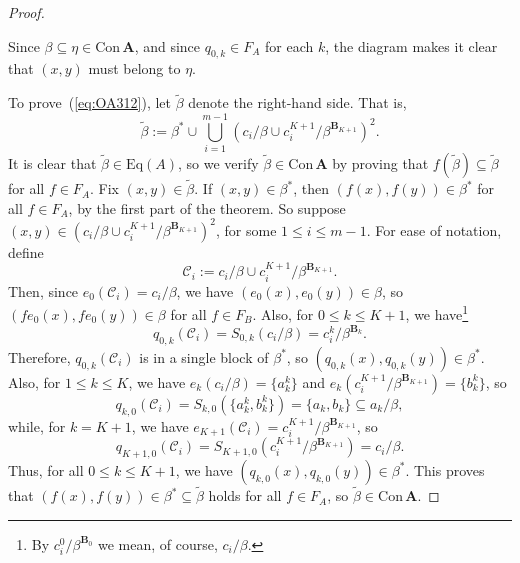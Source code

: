 \documentclass[cm,dissertation]{uhthesis}
\theoremstyle{plain}
\theoremstyle{definition}
\theoremstyle{remark}
\numberwithin{theorem}{section}
\numberwithin{claim}{chapter}
\numberwithin{equation}{section}
\numberwithin{conjecture}{chapter}
\newcommand{\<}{\ensuremath{\langle}}
\renewcommand{\>}{\ensuremath{\rangle}}
\renewcommand{\leq}{\ensuremath{\leqslant}}
\newcommand{\Eq}{\ensuremath{\mathrm{Eq}}}
\newcommand{\Con}{\ensuremath{\mathrm{Con\,}}}
\newcommand{\0}{\ensuremath{\mathbf{0}}}
\newcommand{\1}{\ensuremath{\mathbf{1}}}
\newcommand{\2}{\ensuremath{\mathbf{2}}}
\newcommand{\3}{\ensuremath{\mathbf{3}}}
\newcommand{\4}{\ensuremath{\mathbf{4}}}
\newcommand{\5}{\ensuremath{\mathbf{5}}}
\newcommand{\bA}{\ensuremath{\mathbf{A}}}
\newcommand{\bB}{\ensuremath{\mathbf{B}}}
\newcommand{\sC}{\ensuremath{\mathscr{C}}}
\newcommand{\tbeta}{\ensuremath{\widetilde{\beta}}}
\newcommand{\cick}{\ensuremath{\sC_i}}
\newcommand{\CICK}{\ensuremath{c_i/\beta \cup c^{K+1}_i/\beta^{\bB_{K+1}}}}
\begin{document}
\begin{proof}
\begin{center}
  \end{center}
  Since $\beta \subseteq \eta \in \Con\bA$, and since $q_{0,k}\in F_A$ for each
  $k$, the diagram makes it clear that $(x,y)$ must belong to $\eta$.

  To prove~(\ref{eq:OA312}), let $\widetilde{\beta}$ denote the right-hand side.  That
  is,
  \[
  \widetilde{\beta}:= \beta^* \cup \bigcup_{i=1}^{m-1} 
  (c_i/\beta \cup c^{K+1}_i/\beta^{\bB_{K+1}})^2.
  \]
  It is clear that $\tbeta \in \Eq(A)$, so we verify $\widetilde{\beta} \in
  \Con \bA$ by proving that $f(\tbeta) \subseteq \tbeta$ for all $f\in F_A$.
  Fix $(x,y) \in \tbeta$.  If 
  $(x,y) \in \beta^*$, then 
  $(f(x),f(y))\in \beta^*$ for all $f\in F_A$, by the first part of the theorem.
  So suppose 
  $(x,y) \in (\CICK)^2$, 
  for some $1\leq i \leq m-1$.
  For ease of notation, define
  \[
  \cick := \CICK.
  \]
  Then, since
  $e_0(\cick) = c_i/\beta$, we have
  $(e_0(x), e_0(y))\in \beta$, so
  $(fe_0(x), fe_0(y))\in \beta$ for all $f\in F_B$.
  Also, for $0\leq k\leq K+1$, we 
  have\footnote{By $c_i^{0}/\beta^{\bB_{0}}$ we mean, of course, $c_i/\beta$.}
  \[
  q_{0,k}(\cick) = S_{0,k}(c_i/\beta) = 
  c_i^{k}/\beta^{\bB_{k}}.
  \]
  Therefore,
  $q_{0,k}(\cick)$ is in a single block of $\beta^*$, so 
  $(q_{0,k}(x), q_{0,k}(y)) \in \beta^*$.
  Also, for $1\leq k \leq K$, we have 
  $e_k(c_i/\beta) = \{a_k^k\}$ and 
  $e_k(c_i^{K+1}/\beta^{\bB_{K+1}})= \{b_k^k\}$, so 
  \[
  q_{k,0}(\cick) = S_{k,0}(\{a_k^k, b_k^k\}) = \{a_k, b_k\} \subseteq a_k/\beta,
  \]
  while, for $k=K+1$, we have 
  $e_{K+1}(\cick) = c_i^{K+1}/\beta^{\bB_{K+1}}$, so 
  \[
  q_{K+1,0}(\cick) = S_{K+1,0}(c_i^{K+1}/\beta^{\bB_{K+1}}) = c_i/\beta.
  \]
  Thus, for all $0\leq k \leq K+1$, we have 
  $(q_{k,0}(x), q_{k,0}(y)) \in \beta^*$.
  This proves that
  $(f(x),f(y))\in \beta^*\subseteq \tbeta$ holds for all $f\in F_A$, so $\tbeta
  \in \Con \bA$.


\end{proof}
\end{document}
